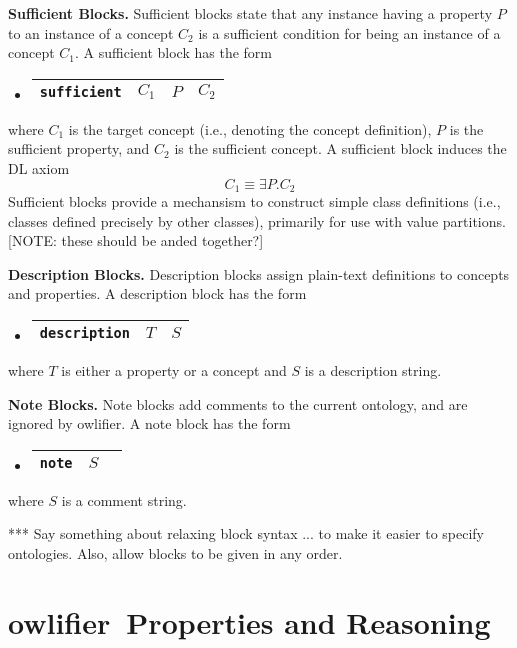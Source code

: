 \documentclass[preprint,number]{elsarticle}
\newcommand{\owlifier}{\textsf{owlifier}}
\newcommand{\myblock}[1]{\vspace{12pt}\noindent\textbf{#1}}
\begin{document}
\myblock{Sufficient Blocks.} Sufficient blocks state that any instance
having a property $P$ to an instance of a concept $C_2$ is a
sufficient condition for being an instance of a concept $C_1$. A
sufficient block has the form
\begin{itemize}
\item[]
  \begin{tabular}{|l|l|l|l|}\hline \texttt{sufficient} & $C_1$ & $P$ & $C_2$
    \\ \hline
  \end{tabular}
\end{itemize}
where $C_1$ is the target concept (i.e., denoting the concept
definition), $P$ is the sufficient property, and $C_2$ is the
sufficient concept. A sufficient block induces the DL axiom \[C_1
\equiv \exists P.C_2\] Sufficient blocks provide a mechansism to
construct simple class definitions (i.e., classes defined precisely by
other classes), primarily for use with value partitions. [NOTE: these
should be anded together?]


\myblock{Description Blocks.} Description blocks assign plain-text
definitions to concepts and properties. A description block has the
form
\begin{itemize}
\item[]
  \begin{tabular}{|l|l|l|}\hline \texttt{description} & $T$ & $S$
    \\ \hline
  \end{tabular}
\end{itemize}
where $T$ is either a property or a concept and $S$ is a description
string.


\myblock{Note Blocks.} Note blocks add comments to the current
ontology, and are ignored by \owlifier.  A note block has the form
\begin{itemize}
\item[]
  \begin{tabular}{|l|l|l|}\hline \texttt{note} & $S$
\\ \hline
  \end{tabular}
\end{itemize}
where $S$ is a comment string.


*** Say something about relaxing block syntax ... to make it easier to
specify ontologies. Also, allow blocks to be given in any order.


\section{\owlifier\ Properties and Reasoning}
\label{sec:properties}
\end{document}

